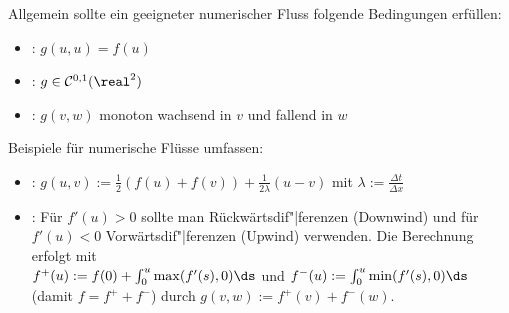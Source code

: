 \linie

\begin{Bem}
    Allgemein sollte ein geeigneter numerischer Fluss folgende Bedingungen erfüllen:
    \begin{itemize}
        \item
        :
        $g(u, u) = f(u)$

        \item
        :
        $g \in \C^{0,1}(\real^2)$

        \item
        :
        $g(v, w)$ monoton wachsend in $v$ und fallend in $w$
    \end{itemize}
\end{Bem}

\begin{Bsp}
    Beispiele für numerische Flüsse umfassen:
    \begin{itemize}
        \item
        :
        $g(u, v) := \frac{1}{2} (f(u) + f(v)) + \frac{1}{2\lambda} (u - v)$
        mit $\lambda := \frac{\Delta t}{\Delta x}$

        \item
        :
        Für $f'(u) > 0$ sollte man Rückwärtsdif"|ferenzen (Downwind)
        und für $f'(u) < 0$ Vorwärtsdif"|ferenzen (Upwind) verwenden.
        Die Berechnung erfolgt mit\\
        $f^+(u) := f(0) + \int_0^u \max(f'(s), 0) \ds$ und
        $f^-(u) := \int_0^u \min(f'(s), 0) \ds$ (damit $f = f^+ + f^-$)
        durch $g(v, w) := f^+(v) + f^-(w)$.
    \end{itemize}
\end{Bsp}

\pagebreak
